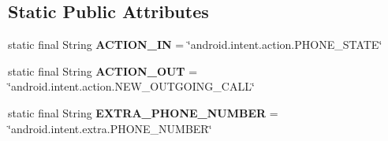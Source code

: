 \subsection*{Static Public Attributes}
\begin{DoxyCompactItemize}
\item 
\mbox{\label{classcom_1_1aykuttasil_1_1callrecord_1_1receiver_1_1_call_record_receiver_aa3e89e7d92e8523a2b473a760fd52dbf}} 
static final String {\bfseries A\+C\+T\+I\+O\+N\+\_\+\+IN} = \char`\"{}android.\+intent.\+action.\+P\+H\+O\+N\+E\+\_\+\+S\+T\+A\+TE\char`\"{}
\item 
\mbox{\label{classcom_1_1aykuttasil_1_1callrecord_1_1receiver_1_1_call_record_receiver_a7888c821496f5072c699e7db9934e9aa}} 
static final String {\bfseries A\+C\+T\+I\+O\+N\+\_\+\+O\+UT} = \char`\"{}android.\+intent.\+action.\+N\+E\+W\+\_\+\+O\+U\+T\+G\+O\+I\+N\+G\+\_\+\+C\+A\+LL\char`\"{}
\item 
\mbox{\label{classcom_1_1aykuttasil_1_1callrecord_1_1receiver_1_1_call_record_receiver_ae4f527d3dd71f59890f9d376928cb902}} 
static final String {\bfseries E\+X\+T\+R\+A\+\_\+\+P\+H\+O\+N\+E\+\_\+\+N\+U\+M\+B\+ER} = \char`\"{}android.\+intent.\+extra.\+P\+H\+O\+N\+E\+\_\+\+N\+U\+M\+B\+ER\char`\"{}
\end{DoxyCompactItemize}
